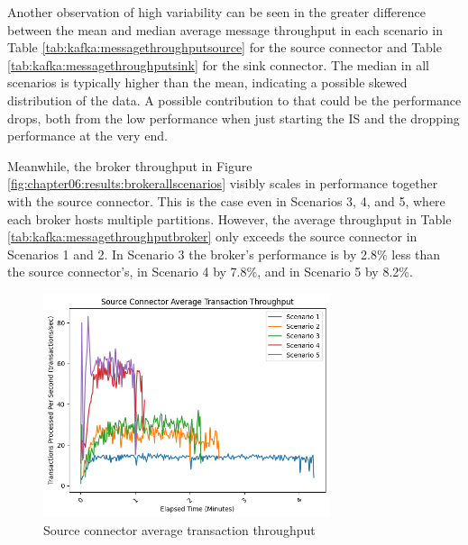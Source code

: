 Another observation of high variability can be seen in the greater difference between the mean and median average message throughput in each scenario in Table \ref{tab:kafka:messagethroughputsource} for the source connector and Table \ref{tab:kafka:messagethroughputsink} for the sink connector. The median in all scenarios is typically higher than the mean, indicating a possible skewed distribution of the data. A possible contribution to that could be the performance drops, both from the low performance when just starting the \ac{IS} and the dropping performance at the very end.

Meanwhile, the broker throughput in Figure \ref{fig:chapter06:results:brokerallscenarios} visibly scales in performance together with the source connector. This is the case even in Scenarios 3, 4, and 5, where each broker hosts multiple partitions. However, the average throughput in Table \ref{tab:kafka:messagethroughputbroker} only exceeds the source connector in Scenarios 1 and 2. In Scenario 3 the broker's performance is by 2.8\% less than the source connector's, in Scenario 4 by 7.8\%, and in Scenario 5 by 8.2\%.


\begin{figure}[htbp]
    \centering
    \includegraphics[width=0.75\textwidth]{chapters/images/allscenarios/source-avg-runs-all-scenarios-transaction.png}
    \caption{Source connector average transaction throughput}
    \label{fig:chapter06:results:sourceallscenariostrans}
\end{figure}

